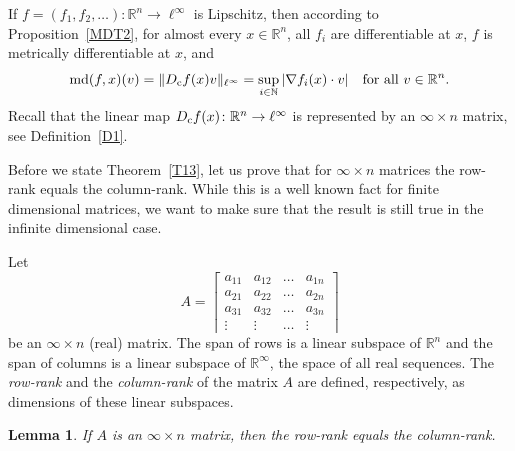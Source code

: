 \documentclass[12pt,leqno]{amsart}
\newtheorem{lemma}[theorem]{Lemma}
\theoremstyle{definition}
\newcommand{\bbbn}{\mathbb N}
\newcommand{\bbbr}{\mathbb R}
\def\md{\operatorname{md}}
\numberwithin{theorem}{section} \numberwithin{equation}{section}
\begin{document}
If  $f=(f_1,f_2,\ldots)\colon\bbbr^n\to\ell^\infty$ is Lipschitz, then according to Proposition~\ref{MDT2}, for almost every $x\in \bbbr^n$, all $f_i$ are differentiable at $x$, $f$ is metrically differentiable at $x$, and
$$
\md(f,x)(v)=\Vert D_{\rm c}f(x)v\Vert_{\ell^\infty}=\sup_{i\in\bbbn}|\nabla f_i(x)\cdot v|
\quad
\text{for all $v\in\bbbr^n$.}
$$
Recall that the linear map $D_{\rm c}f(x)\colon\bbbr^n\to\ell^\infty$ is represented by an $\infty\times n$ matrix, see Definition~\ref{D1}.

Before we state Theorem~\ref{T13}, let us prove that for $\infty\times n$ matrices the row-rank equals the column-rank. While this is a well known fact for finite dimensional matrices, we want to make sure that the result is still true in the infinite dimensional case.

Let
$$
A=
\left\lceil
\begin{array}{cccc}
a_{11} & a_{12} & \ldots & a_{1n}\\
a_{21} & a_{22} & \ldots & a_{2n}\\
a_{31} & a_{32} & \ldots & a_{3n}\\
\vdots & \vdots & \ldots & \vdots
\end{array}
\right\rceil
$$
be an $\infty\times n$ (real) matrix. The span of rows is a linear subspace of $\bbbr^n$ and the span of columns is a linear subspace of $\bbbr^\infty$, the space of all real sequences. The {\em row-rank} and the {\em column-rank} of the matrix $A$ are defined, respectively, as dimensions of these linear subspaces.
\begin{lemma}
\label{gum8}
If $A$ is an $\infty\times n$ matrix, then the row-rank equals the column-rank.
\end{lemma}
\end{document}

